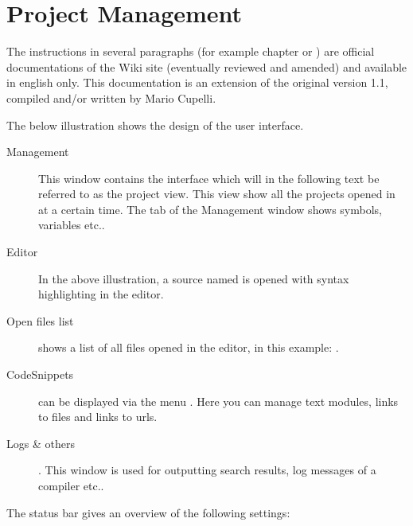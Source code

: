 \chapter{\codeblocks Project Management}

The instructions in several paragraphs (for example chapter  or ) are official documentations of the \codeblocks Wiki site (eventually reviewed and amended) and available in english only.
This documentation is an extension of the original version 1.1, compiled and/or written by Mario Cupelli.

The below illustration shows the design of the \codeblocks user interface.


\begin{description}
\item[Management] This window contains the interface  which will in the following text be referred to as the project view. This view show all the projects opened in \codeblocks at a certain time. The  tab of the Management window shows symbols, variables etc..
\item[Editor] In the above illustration, a source named  is opened with syntax highlighting in the editor.
\item[Open files list] shows a list of all files opened in the editor, in this example: .
\item[CodeSnippets] can be displayed via the menu . Here you can manage text modules, links to files and links to urls.
\item[Logs \& others]. This window is used for outputting search results, log messages of a compiler etc..
\end{description}

The status bar gives an overview of the following settings:

